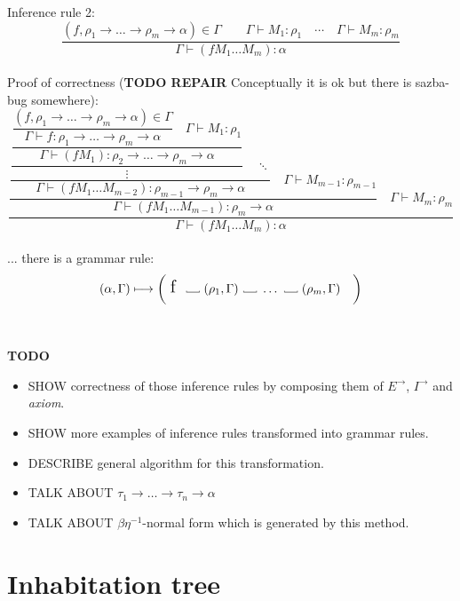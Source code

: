 \documentclass[12pt,a4paper]{report}
\newcommand\Vtextvisiblespace[1][.3em]{%
  \mbox{\kern.06em\vrule height.3ex}%
  \vbox{\hrule width#1}%
  \hbox{\vrule height.3ex}}
\begin{document}
Inference rule 2: 
\[
	\frac{ (f , \rho_1 \rightarrow \dots \rightarrow \rho_m \rightarrow \alpha ) \in \Gamma \qquad
	       \Gamma \vdash M_1 : \rho_1 \quad
	       \dotsm \quad
	       \Gamma \vdash M_m : \rho_m        
	      }
	     {\Gamma \vdash (f M_1 \dots M_m) : \alpha}
\]
\\
Proof of correctness (\textbf{TODO REPAIR} Conceptually it is ok but there is sazba-bug somewhere): 
\[
   \dfrac
     {\dfrac
      {\dfrac
       {\dfrac         
         {\dfrac  
          {\dfrac
           {\boxed{(f , \rho_1 \rightarrow \dots \rightarrow \rho_m \rightarrow \alpha ) \in \Gamma}}
           {\Gamma \vdash f : \rho_1 \rightarrow \dots \rightarrow \rho_m \rightarrow \alpha}
           \quad
           \boxed{\Gamma \vdash M_1 : \rho_1} }
          {\Gamma \vdash (f M_1) : \rho_2 \rightarrow \dots \rightarrow \rho_m \rightarrow \alpha }
          }{\vdots} 
         \quad 
         \ddots }
       {\Gamma \vdash (f M_1 \dots M_{m-2}) : \rho_{m-1} \rightarrow \rho_m \rightarrow \alpha}
       \quad
       \boxed{\Gamma \vdash M_{m-1} : \rho_{m-1}}  }
      {\Gamma \vdash (f M_1 \dots M_{m-1}) : \rho_m \rightarrow \alpha}       
      \quad 
      \boxed{\Gamma \vdash M_m : \rho_m} }
	 {\Gamma \vdash (f M_1 \dots M_m) : \alpha}
\]
\\
... there is a grammar rule:
\[ 
	( \alpha , \Gamma )  \longmapsto
	\bigg( \mbox{ {\Large f }}
	  \mbox{ \Vtextvisiblespace[1em] } 
	  ( \rho_1 , \Gamma )
	  \mbox{ \Vtextvisiblespace[1em] } 
	  \dots
	  \mbox{ \Vtextvisiblespace[1em] } 
	  ( \rho_m , \Gamma )
	  \quad \bigg)
\]
\\\\
\textbf{TODO} 
\begin{itemize}
	\item SHOW correctness of those inference rules by composing them of 
		  $E^{\rightarrow}$, $I^{\rightarrow}$ and \textit{axiom}.
	\item SHOW more examples of inference rules transformed into grammar rules.
	\item DESCRIBE general algorithm for this transformation.
	\item TALK ABOUT $\tau_1 \rightarrow \dots \rightarrow \tau_n \rightarrow \alpha$ 
	\item TALK ABOUT $\beta \eta^{-1}$-normal form which is generated by this method.
\end{itemize}


\newpage
\section{Inhabitation tree}
\end{document}
